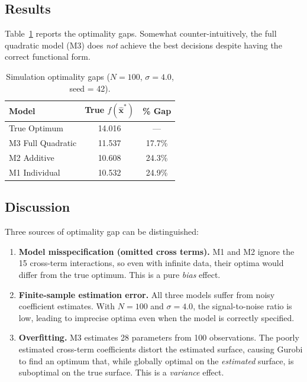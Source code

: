 \documentclass[12pt]{article}
\newcommand{\bx}{\mathbf{x}}
\begin{document}
\subsection{Results}

Table~\ref{tab:sim_gaps} reports the optimality gaps. Somewhat counter-intuitively, the full quadratic model (M3) does \emph{not} achieve the best decisions despite having the correct functional form.

\begin{table}[htbp]
\centering
\caption{Simulation optimality gaps ($N = 100$, $\sigma = 4.0$, seed = 42).}
\label{tab:sim_gaps}
\begin{tabular}{lcc}
\toprule
Model & True $f(\hat{\bx}^*)$ & \% Gap \\
\midrule
True Optimum           & 14.016 & ---   \\
M3 Full Quadratic      & 11.537 & 17.7\% \\
M2 Additive            & 10.608 & 24.3\% \\
M1 Individual          & 10.532 & 24.9\% \\
\bottomrule
\end{tabular}
\end{table}

\subsection{Discussion}

Three sources of optimality gap can be distinguished:

\begin{enumerate}
    \item \textbf{Model misspecification (omitted cross terms).} M1 and M2 ignore the 15 cross-term interactions, so even with infinite data, their optima would differ from the true optimum. This is a pure \emph{bias} effect.

    \item \textbf{Finite-sample estimation error.} All three models suffer from noisy coefficient estimates. With $N = 100$ and $\sigma = 4.0$, the signal-to-noise ratio is low, leading to imprecise optima even when the model is correctly specified.

    \item \textbf{Overfitting.} M3 estimates 28 parameters from 100 observations. The poorly estimated cross-term coefficients distort the estimated surface, causing Gurobi to find an optimum that, while globally optimal on the \emph{estimated} surface, is suboptimal on the true surface. This is a \emph{variance} effect.
\end{enumerate}
\end{document}
